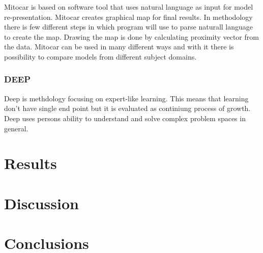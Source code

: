 \documentclass[english]{tktltiki2}
\theoremstyle{definition}
\theoremstyle{remark}
\begin{document}
Mitocar is based on software tool that uses natural language as input for model re-presentation. Mitocar creates graphical map for final results. In methodology there is few different steps in which program will use to parse naturall language to create the map. Drawing the map is done by calculating proximity vector from the data. Mitocar can be used in many different ways and with it there is possibility to compare models from different subject domains.

\subsubsection{DEEP}

Deep is methdology focusing on expert-like learning. This means that learning don't have single end point but it is evaluated as continiung process of growth. Deep uses persons ability to understand and solve complex problem spaces in general.

\section{Results}

\section{Discussion}

\section{Conclusions}

%
%
% 
%







%
\end{document}
